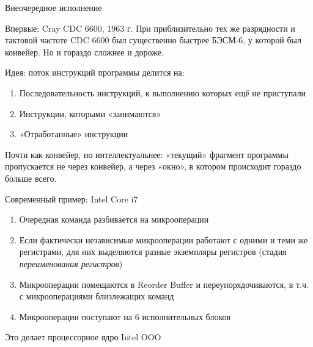 \documentclass[xetex,aspectratio=43]{beamer}
\begin{document}
\begin{frame}{Внеочередное исполнение}

    Впервые: Cray CDC 6600, 1963 г. При приблизительно тех же разрядности и
    тактовой частоте CDC 6600 был существенно быстрее БЭСМ-6, у которой был
    конвейер. Но и гораздо сложнее и дороже.

    Идея: поток инструкций программы делится на:

    \begin{enumerate}
        \tightlist
        \item
        Последовательность инструкций, к выполнению которых ещё не приступали
        \item
        Инструкции, которыми «занимаются»
        \item
        «Отработанные» инструкции
    \end{enumerate}

    \pause

    Почти как конвейер, но интеллектуальнее: «текущий» фрагмент программы
    пропускается не через конвейер, а через «окно», в котором происходит
    гораздо больше всего.
\end{frame}

\begin{frame}{Современный пример: Intel Core i7}
        \begin{enumerate}
            \tightlist
            \item
            Очередная команда разбивается на микрооперации
            \item
            Если фактически независимые микрооперации работают с одними и теми же
            регистрами, для них выделяются разные экземпляры регистров (стадия
            \emph{переименования регистров})
            \item
            Микрооперации помещаются в Reorder Buffer и переупорядочиваются, в
            т.ч. с микрооперациями близлежащих команд
            \item
            Микрооперации поступают на 6 исполнительных блоков
        \end{enumerate}

        Это делает процессорное ядро Intel OOO
\end{frame}
\end{document}
